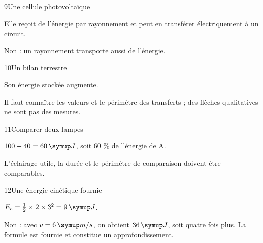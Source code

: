 \par\noindent\begin{minipage}{\linewidth}
\begin{corrige}{9}{Une cellule photovoltaïque}
\begin{questions}
\item Elle reçoit de l’énergie par rayonnement et peut en transférer électriquement à un circuit.
\item Non : un rayonnement transporte aussi de l’énergie.
\end{questions}
\end{corrige}
\end{minipage}
\par\noindent\begin{minipage}{\linewidth}
\begin{corrige}{10}{Un bilan terrestre}
\begin{questions}
\item Son énergie stockée augmente.
\item Il faut connaître les valeurs et le périmètre des transferts ; des flèches qualitatives ne sont pas des mesures.
\end{questions}
\end{corrige}
\end{minipage}
\par\noindent\begin{minipage}{\linewidth}
\begin{corrige}{11}{Comparer deux lampes}
\begin{questions}
\item $100-40=60\unite J$, soit 60 \% de l’énergie de A.
\item L’éclairage utile, la durée et le périmètre de comparaison doivent être comparables.
\end{questions}
\end{corrige}
\end{minipage}
\par\noindent\begin{minipage}{\linewidth}
\begin{corrige}{12}{Une énergie cinétique fournie}
\begin{questions}
\item $E_c=\frac12\times2\times3^2=9\unite J$.
\item Non : avec $v=6\unite{m/s}$, on obtient $36\unite J$, soit quatre fois plus. La formule est fournie et constitue un approfondissement.
\end{questions}
\end{corrige}
\end{minipage}
